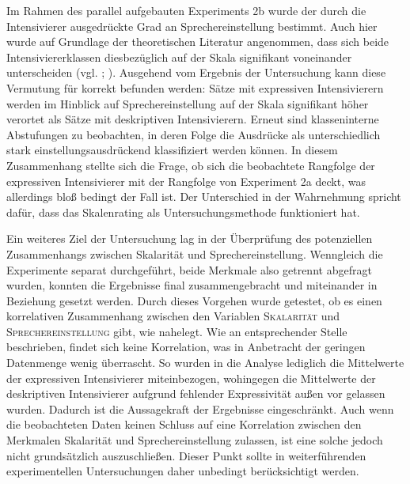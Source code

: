 Im Rahmen des parallel aufgebauten Experiments 2b wurde der durch die Intensivierer ausgedrückte Grad an Sprechereinstellung bestimmt. Auch hier wurde auf Grundlage der theoretischen Literatur angenommen, dass sich beide Intensiviererklassen diesbezüglich auf der Skala signifikant voneinander unterscheiden (vgl. \citealt[315]{Lang.1983}; {\citealt[57]{Ortner.2014}}). Ausgehend vom Ergebnis der Untersuchung kann diese Vermutung für korrekt befunden werden: Sätze mit expressiven Intensivierern werden im Hinblick auf Sprechereinstellung auf der Skala signifikant höher verortet als Sätze mit deskriptiven Intensivierern. Erneut sind klasseninterne Abstufungen zu beobachten, in deren Folge die Ausdrücke als unterschiedlich stark einstellungsausdrückend klassifiziert werden können. In diesem Zusammenhang stellte sich die Frage, ob sich die beobachtete Rangfolge der expressiven Intensivierer mit der Rangfolge von Experiment 2a deckt, was allerdings bloß bedingt der Fall ist. Der Unterschied in der Wahrnehmung spricht dafür, dass das Skalenrating als Untersuchungsmethode funktioniert hat.


Ein weiteres Ziel der Untersuchung lag in der Überprüfung des potenziellen Zusammenhangs zwischen Skalarität und Sprechereinstellung. Wenngleich die Experimente separat durchgeführt, beide Merkmale also getrennt abgefragt wurden, konnten die Ergebnisse final zusammengebracht und miteinander in Beziehung gesetzt werden. Durch dieses Vorgehen wurde getestet, ob es einen korrelativen Zusammenhang zwischen den Variablen {\textsc{Skalarität}} und \textsc{Sprechereinstellung} gibt, wie \citet[133]{Gutzmann.2019a} nahelegt. Wie an entsprechender Stelle beschrieben, findet sich keine Korrelation, was in Anbetracht der geringen Datenmenge wenig überrascht. So wurden in die Analyse lediglich die Mittelwerte der expressiven Intensivierer miteinbezogen, wohingegen die Mittelwerte der deskriptiven Intensivierer aufgrund fehlender Expressivität außen vor gelassen wurden. Dadurch ist die Aussagekraft der Ergebnisse eingeschränkt. Auch wenn die beobachteten Daten keinen Schluss auf eine Korrelation zwischen den Merkmalen Skalarität und Sprechereinstellung zulassen, ist eine solche jedoch nicht grundsätzlich auszuschließen. Dieser Punkt sollte in weiterführenden experimentellen Untersuchungen daher unbedingt berücksichtigt werden.


